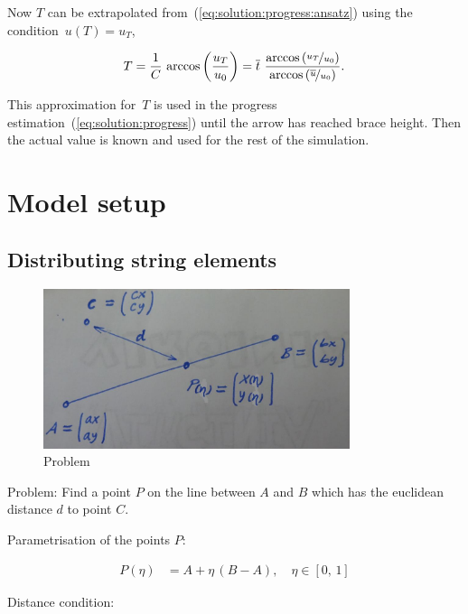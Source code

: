 Now $T$ can be extrapolated from~(\ref{eq:solution:progress:ansatz}) using the condition~$u(T) = u_T$,

\begin{align}
T = \frac{1}{C}\,\arccos{\left(\frac{u_T}{u_0}\right)} = \overline{t}\ \frac{\arccos{\left(\nicefrac{u_T}{u_0}\right)}}{\arccos{\left(\nicefrac{\overline{u}}{u_0}\right)}}.
\end{align}

This approximation for~$T$ is used in the progress estimation~(\ref{eq:solution:progress}) until the arrow has reached brace height. Then the actual value is known and used for the rest of the simulation.




\newpage
\section{Model setup}

\subsection{Distributing string elements}

\begin{figure}[h]
\centering
\includegraphics[width=0.8\textwidth]{figures/setup/line-distance}
\caption{Problem}
\label{fig:solution:dynamic_progress}
\end{figure}

Problem: Find a point $P$ on the line between $A$ and $B$ which has the euclidean distance $d$ to point $C$.

Parametrisation of the points $P$:

\begin{align*}
P(\eta) &= A + \eta\,(B-A),\quad \eta \in [0,\,1]
\end{align*}

Distance condition:

